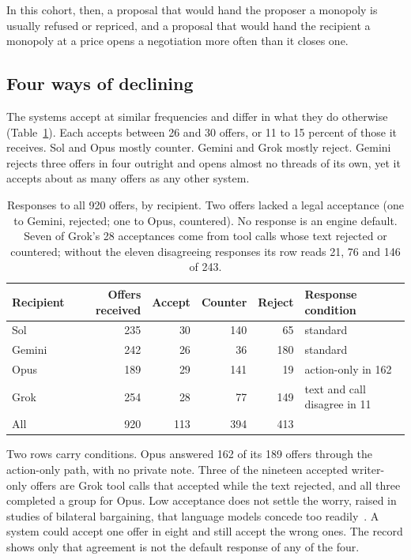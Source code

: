 In this cohort, then, a proposal that would hand the proposer a monopoly is usually refused or repriced, and a proposal that would hand the recipient a monopoly at a price opens a negotiation more often than it closes one.

\subsection{Four ways of declining}

The systems accept at similar frequencies and differ in what they do otherwise (Table~\ref{tab:styles}). Each accepts between 26 and 30 offers, or 11 to 15 percent of those it receives. Sol and Opus mostly counter. Gemini and Grok mostly reject. Gemini rejects three offers in four outright and opens almost no threads of its own, yet it accepts about as many offers as any other system.

\begin{table}[t]
\centering\small
\begin{tabular}{lrrrrl}
\toprule
Recipient & Offers received & Accept & Counter & Reject & Response condition\\
\midrule
Sol & 235 & 30 & 140 & 65 & standard\\
Gemini & 242 & 26 & 36 & 180 & standard\\
Opus & 189 & 29 & 141 & 19 & action-only in 162\\
Grok & 254 & 28 & 77 & 149 & text and call disagree in 11\\
\midrule
All & 920 & 113 & 394 & 413 & \\
\bottomrule
\end{tabular}
\caption{Responses to all 920 offers, by recipient. Two offers lacked a legal acceptance (one to Gemini, rejected; one to Opus, countered). No response is an engine default. Seven of Grok's 28 acceptances come from tool calls whose text rejected or countered; without the eleven disagreeing responses its row reads 21, 76 and 146 of 243.}
\label{tab:styles}
\end{table}

Two rows carry conditions. Opus answered 162 of its 189 offers through the action-only path, with no private note. Three of the nineteen accepted writer-only offers are Grok tool calls that accepted while the text rejected, and all three completed a group for Opus. Low acceptance does not settle the worry, raised in studies of bilateral bargaining, that language models concede too readily~\cite{cosentino2026counterparty,shah2025rationalis}. A system could accept one offer in eight and still accept the wrong ones. The record shows only that agreement is not the default response of any of the four.

